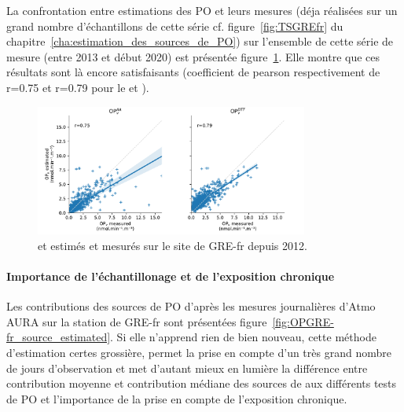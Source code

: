 La confrontation entre estimations des PO et leurs mesures (déja réalisées sur un grand
nombre d'échantillons de cette série cf. figure~\ref{fig:TSGREfr} du
chapitre~\ref{cha:estimation_des_sources_de_PO}) sur l'ensemble de cette série de mesure
(entre 2013 et début 2020) est présentée figure~\ref{fig:OPGRE-fr-estimated_scatter}. Elle
montre que ces résultats sont là encore satisfaisants (coefficient de pearson respectivement de r=0.75 et r=0.79
pour le \POAAv{} et \PODTTv).

\begin{figure}[ht]
    \centering
    \includegraphics[width=0.8\textwidth]{figures/chapter05/OPGRE-fr_estimated_scatter.pdf}
    \caption{\POAAv{} et \PODTTv{} estimés et mesurés sur le site de GRE-fr depuis 2012.}
    \label{fig:OPGRE-fr-estimated_scatter}
\end{figure}

\paragraph{Importance de l'échantillonage et de l'exposition chronique}%
\label{par:importance_de_l_échantillonage_et_de_l_exposition_chronique}


Les contributions des sources de PO d'après les mesures journalières d'Atmo AURA sur la
station de GRE-fr sont présentées figure~\ref{fig:OPGRE-fr_source_estimated}. %
Si elle n'apprend rien de bien nouveau, cette méthode d'estimation certes grossière,
permet la prise en compte d'un très grand nombre de jours d'observation et met d'autant
mieux en lumière la différence entre contribution moyenne et contribution médiane des
sources de \PMdix{} aux différents tests de PO et l'importance de la prise en compte de
l'exposition chronique.

